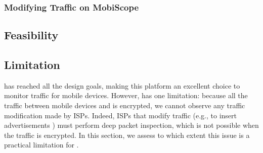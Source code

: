 \subsubsection{Modifying Traffic on MobiScope}
\label{sec:modif-traffic-mobiscope}







\subsection{Feasibility}


\subsection{Limitation}
\platname {} has reached all the design goals, making this platform an
excellent choice to monitor traffic for mobile devices. However,
\platname{} has one limitation: because all the traffic between mobile
devices and \platname{} is encrypted, we cannot observe any traffic
modification made by ISPs. Indeed, ISPs that modify traffic (e.g., to insert
advertisements ) must perform deep packet
inspection, which is not possible when the traffic is encrypted.  In
this section, we assess to which extent this issue is a practical
limitation for \platname.



